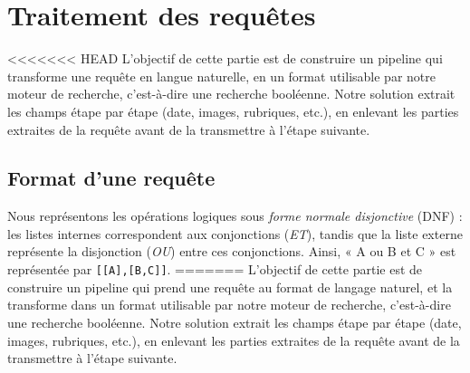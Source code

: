 \chapter{Traitement des requêtes}

<<<<<<< HEAD
L'objectif de cette partie est de construire un pipeline qui transforme une requête en langue naturelle, en un format utilisable par notre moteur de recherche,
c'est-à-dire une recherche booléenne. Notre solution extrait les champs étape par étape (date, images, rubriques, etc.), en enlevant les parties extraites de la requête avant de la transmettre à l'étape suivante.

\section{Format d'une requête}
Nous représentons les opérations logiques sous \textit{forme normale disjonctive} (DNF) : 
les listes internes correspondent aux conjonctions (\textit{ET}), 
tandis que la liste externe représente la disjonction (\textit{OU}) entre ces conjonctions. 
Ainsi, « A ou B et C » est représentée par \texttt{[[A],[B,C]]}.
=======
L'objectif de cette partie est de construire un pipeline qui prend une requête au format de langage naturel, et la transforme dans un format utilisable par notre moteur de recherche,
c'est-à-dire une recherche booléenne. Notre solution extrait les champs étape par étape (date, images, rubriques, etc.), en enlevant les parties extraites de la requête avant de la transmettre à l'étape suivante.

